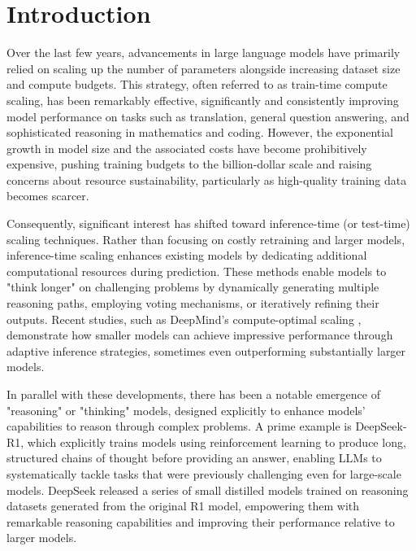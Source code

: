 \chapter{Introduction}

Over the last few years, advancements in large language models have primarily relied on scaling up the number of parameters alongside increasing dataset size and compute budgets. This strategy, often referred to as train-time compute scaling, has been remarkably effective, significantly and consistently improving model performance on tasks such as translation, general question answering, and sophisticated reasoning in mathematics and coding. However, the exponential growth in model size and the associated costs have become prohibitively expensive, pushing training budgets to the billion-dollar scale and raising concerns about resource sustainability, particularly as high-quality training data becomes scarcer.

Consequently, significant interest has shifted toward inference-time (or test-time) scaling techniques. Rather than focusing on costly retraining and larger models, inference-time scaling enhances existing models by dedicating additional computational resources during prediction. These methods enable models to "think longer" on challenging problems by dynamically generating multiple reasoning paths, employing voting mechanisms, or iteratively refining their outputs. Recent studies, such as DeepMind's compute-optimal scaling \citep{placeholder}, demonstrate how smaller models can achieve impressive performance through adaptive inference strategies, sometimes even outperforming substantially larger models.

In parallel with these developments, there has been a notable emergence of "reasoning" or "thinking" models, designed explicitly to enhance models' capabilities to reason through complex problems. A prime example is DeepSeek-R1, which explicitly trains models using reinforcement learning to produce long, structured chains of thought before providing an answer, enabling LLMs to systematically tackle tasks that were previously challenging even for large-scale models. DeepSeek released a series of small distilled models trained on reasoning datasets generated from the original R1 model, empowering them with remarkable reasoning capabilities and improving their performance relative to larger models.

